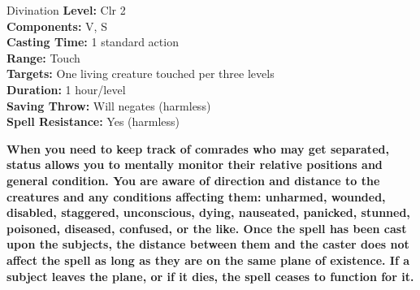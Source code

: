 {Divination}
{
	\textbf{Level:}
	Clr 2\\
	\textbf{Components:}
	V, S\\
	\textbf{Casting Time:}
	1 standard action\\
	\textbf{Range:}
	Touch\\
	\textbf{Targets:}
	One living creature touched per three levels\\
	\textbf{Duration:}
	1 hour/level\\
	\textbf{Saving Throw:}
	Will negates (harmless)\\
	\textbf{Spell Resistance:}
	Yes (harmless)\\
}
{
	\textbf{	When you need to keep track of comrades who may get separated, status allows you to mentally monitor their relative positions and general condition. You are aware of direction and distance to the creatures and any conditions affecting them: unharmed, wounded, disabled, staggered, unconscious, dying, nauseated, panicked, stunned, poisoned, diseased, confused, or the like. Once the spell has been cast upon the subjects, the distance between them and the caster does not affect the spell as long as they are on the same plane of existence. If a subject leaves the plane, or if it dies, the spell ceases to function for it.}

}
